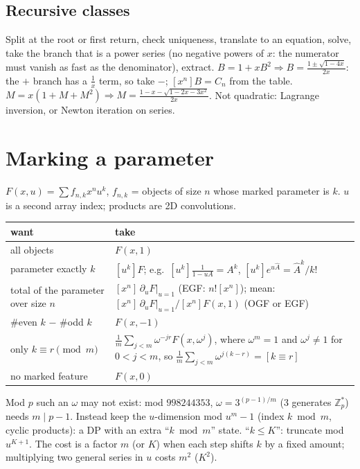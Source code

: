 	\subsection{Recursive classes}
	Split at the root or first return, check uniqueness, translate to an equation, solve, take the branch that is a power series (no negative powers of $x$: the numerator must vanish as fast as the denominator), extract. $B=1+xB^2\Rightarrow B=\frac{1\pm\sqrt{1-4x}}{2x}$: the $+$ branch has a $\frac1x$ term, so take $-$; $[x^n]B=C_n$ from the table. $M=x(1+M+M^2)\Rightarrow M=\frac{1-x-\sqrt{1-2x-3x^2}}{2x}$. Not quadratic: Lagrange inversion, or Newton iteration on series.

\section{Marking a parameter}
	$F(x,u)=\sum f_{n,k}x^nu^k$, $f_{n,k}$ = objects of size $n$ whose marked parameter is $k$. $u$ is a second array index; products are 2D convolutions.
	\begin{center}\small\renewcommand{\arraystretch}{1.3}
	\begin{tabular}{@{}L{3.1cm}@{\ \ }L{5.55cm}@{}}
	want & take \\ \hline
	all objects & $F(x,1)$ \\
	parameter exactly $k$ & $[u^k]F$; e.g.\ $[u^k]\frac1{1-uA}=A^k$, $[u^k]e^{u\hat A}=\hat A^k/k!$ \\
	total of the parameter over size $n$ & $[x^n]\,\partial_uF|_{u=1}$ (EGF: $n![x^n]$); mean: $[x^n]\,\partial_uF|_{u=1}\big/[x^n]F(x,1)$ (OGF or EGF) \\
	\#even $k$ $-$ \#odd $k$ & $F(x,-1)$ \\
	only $k\equiv r\pmod m$ & $\frac1m\sum_{j<m}\omega^{-jr}F(x,\omega^j)$, where $\omega^m=1$ and $\omega^j\ne1$ for $0<j<m$, so $\frac1m\sum_{j<m}\omega^{j(k-r)}=[k\equiv r]$ \\
	no marked feature & $F(x,0)$ \\
	\end{tabular}
	\end{center}
	Mod $p$ such an $\omega$ may not exist: mod $998244353$, $\omega=3^{(p-1)/m}$ ($3$ generates $\mathbb Z_p^*$) needs $m\mid p-1$. Instead keep the $u$-dimension mod $u^m-1$ (index $k\bmod m$, cyclic products): a DP with an extra ``$k\bmod m$'' state. ``$k\le K$'': truncate mod $u^{K+1}$. The cost is a factor $m$ (or $K$) when each step shifts $k$ by a fixed amount; multiplying two general series in $u$ costs $m^2$ ($K^2$).

